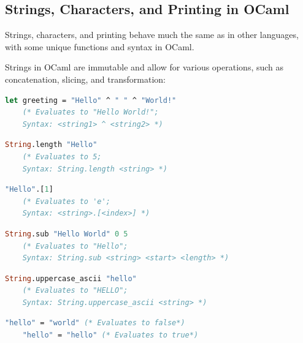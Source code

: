 \newpage

\subsection{Strings, Characters, and Printing in OCaml}

Strings, characters, and printing behave much the same as in other languages, with some unique functions and syntax in OCaml.

\begin{Def}

Strings in OCaml are immutable and allow for various operations, such as concatenation, slicing, and transformation:

    \begin{lstlisting}[language=OCaml, caption={Creating and Concatenating Strings}, numbers=none]
    let greeting = "Hello" ^ " " ^ "World!"
    (* Evaluates to "Hello World!"; 
    Syntax: <string1> ^ <string2> *)
    \end{lstlisting}

    \begin{lstlisting}[language=OCaml, caption={Getting the Length of a String}, numbers=none]
    String.length "Hello"
    (* Evaluates to 5; 
    Syntax: String.length <string> *)
    \end{lstlisting}

    \begin{lstlisting}[language=OCaml, caption={Accessing a Character in a String}, numbers=none]
    "Hello".[1]
    (* Evaluates to 'e'; 
    Syntax: <string>.[<index>] *)
    \end{lstlisting}

    \begin{lstlisting}[language=OCaml, caption={Slicing a String}, numbers=none]
    String.sub "Hello World" 0 5
    (* Evaluates to "Hello"; 
    Syntax: String.sub <string> <start> <length> *)
    \end{lstlisting}

    \begin{lstlisting}[language=OCaml, caption={Converting to Uppercase}, numbers=none]
    String.uppercase_ascii "hello"
    (* Evaluates to "HELLO"; 
    Syntax: String.uppercase_ascii <string> *)
    \end{lstlisting}

    \begin{lstlisting}[language=OCaml, caption={String Equality}, numbers=none]
    "hello" = "world" (* Evaluates to false*)
    "hello" = "hello" (* Evaluates to true*)
    \end{lstlisting}
\end{Def}

